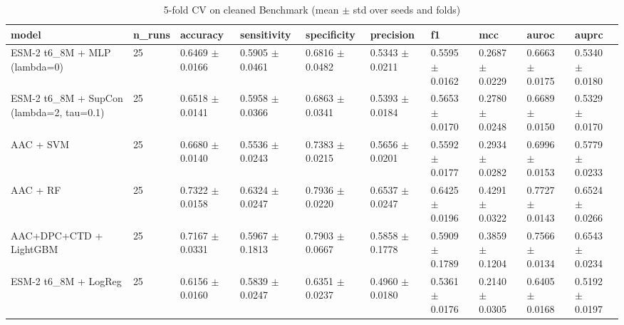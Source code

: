 \begin{table}[ht]
\centering\small
\caption{5-fold CV on cleaned Benchmark (mean $\pm$ std over seeds and folds)}
\label{tab:T5_1_cv_results}
\begin{tabular}{llllllllll}
\hline
model & n\_runs & accuracy & sensitivity & specificity & precision & f1 & mcc & auroc & auprc \\
\hline
ESM-2 t6\_8M + MLP (lambda=0) & 25 & 0.6469 $\pm$ 0.0166 & 0.5905 $\pm$ 0.0461 & 0.6816 $\pm$ 0.0482 & 0.5343 $\pm$ 0.0211 & 0.5595 $\pm$ 0.0162 & 0.2687 $\pm$ 0.0229 & 0.6663 $\pm$ 0.0175 & 0.5340 $\pm$ 0.0180 \\
ESM-2 t6\_8M + SupCon (lambda=2, tau=0.1) & 25 & 0.6518 $\pm$ 0.0141 & 0.5958 $\pm$ 0.0366 & 0.6863 $\pm$ 0.0341 & 0.5393 $\pm$ 0.0184 & 0.5653 $\pm$ 0.0170 & 0.2780 $\pm$ 0.0248 & 0.6689 $\pm$ 0.0150 & 0.5329 $\pm$ 0.0170 \\
AAC + SVM & 25 & 0.6680 $\pm$ 0.0140 & 0.5536 $\pm$ 0.0243 & 0.7383 $\pm$ 0.0215 & 0.5656 $\pm$ 0.0201 & 0.5592 $\pm$ 0.0177 & 0.2934 $\pm$ 0.0282 & 0.6996 $\pm$ 0.0153 & 0.5779 $\pm$ 0.0233 \\
AAC + RF & 25 & 0.7322 $\pm$ 0.0158 & 0.6324 $\pm$ 0.0247 & 0.7936 $\pm$ 0.0220 & 0.6537 $\pm$ 0.0247 & 0.6425 $\pm$ 0.0196 & 0.4291 $\pm$ 0.0322 & 0.7727 $\pm$ 0.0143 & 0.6524 $\pm$ 0.0266 \\
AAC+DPC+CTD + LightGBM & 25 & 0.7167 $\pm$ 0.0331 & 0.5967 $\pm$ 0.1813 & 0.7903 $\pm$ 0.0667 & 0.5858 $\pm$ 0.1778 & 0.5909 $\pm$ 0.1789 & 0.3859 $\pm$ 0.1204 & 0.7566 $\pm$ 0.0134 & 0.6543 $\pm$ 0.0234 \\
ESM-2 t6\_8M + LogReg & 25 & 0.6156 $\pm$ 0.0160 & 0.5839 $\pm$ 0.0247 & 0.6351 $\pm$ 0.0237 & 0.4960 $\pm$ 0.0180 & 0.5361 $\pm$ 0.0176 & 0.2140 $\pm$ 0.0305 & 0.6405 $\pm$ 0.0168 & 0.5192 $\pm$ 0.0197 \\
\hline
\end{tabular}
\end{table}

